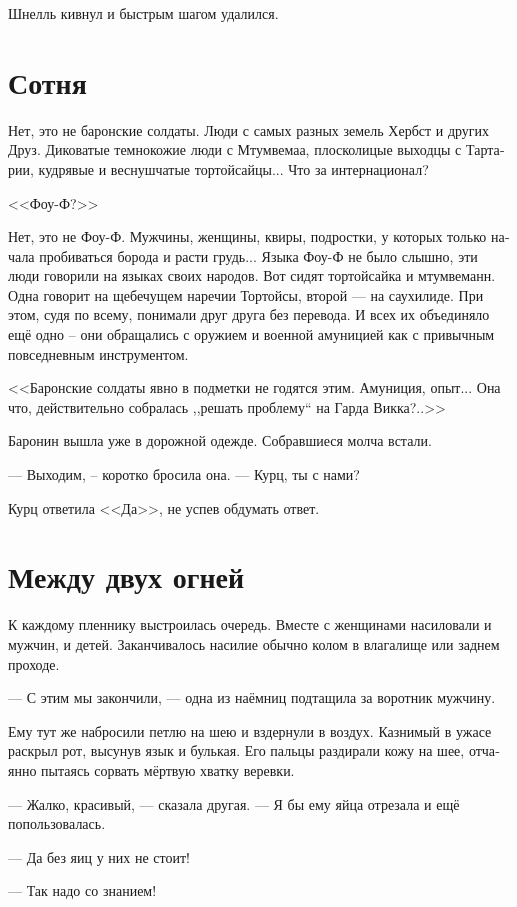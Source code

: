\documentclass[a4paper,12pt,fleqn]{book}\usepackage{cooltooltips}\usepackage{polyglossia}\setdefaultlanguage[babelshorthands=true]{russian}\setotherlanguage{english}\defaultfontfeatures{Ligatures=TeX,Mapping=tex-text} \usepackage{xcolor}\definecolor{lightgray}{HTML}{bbbbbb}\color{lightgray}\newcommand{\ml}[3]{\textenglish{\textcolor{black}{#3}}}
\begin{document}
Шнелль кивнул и быстрым шагом удалился.

\section{Сотня}

Нет, это не баронские солдаты.
Люди с самых разных земель Хербст и других Друз.
Диковатые темнокожие люди с Мтумвемаа, плосколицые выходцы с Тартарии, кудрявые и веснушчатые тортойсайцы...
Что за интернационал?

<<Фоу-Ф?>>

Нет, это не Фоу-Ф.
Мужчины, женщины, квиры, подростки, у которых только начала пробиваться борода и расти грудь...
Языка Фоу-Ф не было слышно, эти люди говорили на языках своих народов.
Вот сидят тортойсайка и мтумвеманн.
Одна говорит на щебечущем наречии Тортойсы, второй --- на саухилиде.
При этом, судя по всему, понимали друг друга без перевода.
И всех их объединяло ещё одно -- они обращались с оружием и военной амуницией как с привычным повседневным инструментом.

<<Баронские солдаты явно в подметки не годятся этим.
Амуниция, опыт...
Она что, действительно собралась ,,решать проблему`` на Гарда Викка?..>>

Баронин вышла уже в дорожной одежде.
Собравшиеся молча встали.

--- Выходим, -- коротко бросила она.
--- Курц, ты с нами?

Курц ответила <<Да>>, не успев обдумать ответ.

\section{Между двух огней}

К каждому пленнику выстроилась очередь.
Вместе с женщинами насиловали и мужчин, и детей.
Заканчивалось насилие обычно колом в влагалище или заднем проходе.

--- С этим мы закончили, --- одна из наёмниц подтащила за воротник мужчину.

Ему тут же набросили петлю на шею и вздернули в воздух.
Казнимый в ужасе раскрыл рот, высунув язык и булькая.
Его пальцы раздирали кожу на шее, отчаянно пытаясь сорвать мёртвую хватку веревки.

--- Жалко, красивый, --- сказала другая.
--- Я бы ему яйца отрезала и ещё попользовалась.

--- Да без яиц у них не стоит!

--- Так надо со знанием!
\end{document}
